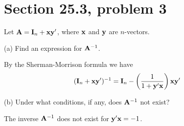 \section{Section 25.3, problem 3}
Let ${\bf A}={\bf I}_n+{\bf x}{\bf y}'$, where $\bf x$ and $\bf y$ are $n$-vectors.

\bigskip
\noindent
(a) Find an expression for ${\bf A}^{-1}$.

\bigskip
\noindent
By the Sherman-Morrison formula we have
$$({\bf I}_n+{\bf x}{\bf y}')^{-1}={\bf I}_n-\left({1\over1+{\bf y}'{\bf x}}\right){\bf x}{\bf y}'$$

\bigskip
\noindent
(b) Under what conditions, if any, does ${\bf A}^{-1}$ not exist?

\bigskip
\noindent
The inverse ${\bf A}^{-1}$ does not exist for ${\bf y}'{\bf x}=-1$.
